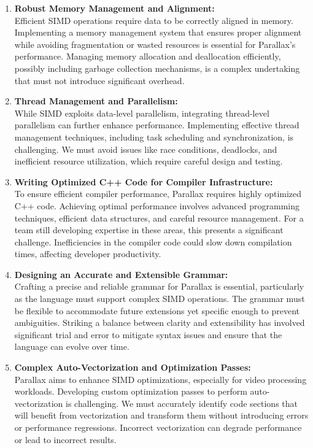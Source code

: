 \documentclass[12pt,a4paper]{article}
\begin{document}
\begin{enumerate}
    \item \textbf{Robust Memory Management and Alignment:} \\
    Efficient SIMD operations require data to be correctly aligned in memory. Implementing a memory management system that ensures proper alignment while avoiding fragmentation or wasted resources is essential for Parallax's performance. Managing memory allocation and deallocation efficiently, possibly including garbage collection mechanisms, is a complex undertaking that must not introduce significant overhead.

    \item \textbf{Thread Management and Parallelism:} \\
    While SIMD exploits data-level parallelism, integrating thread-level parallelism can further enhance performance. Implementing effective thread management techniques, including task scheduling and synchronization, is challenging. We must avoid issues like race conditions, deadlocks, and inefficient resource utilization, which require careful design and testing.

    \item \textbf{Writing Optimized C++ Code for Compiler Infrastructure:} \\
    To ensure efficient compiler performance, Parallax requires highly optimized C++ code. Achieving optimal performance involves advanced programming techniques, efficient data structures, and careful resource management. For a team still developing expertise in these areas, this presents a significant challenge. Inefficiencies in the compiler code could slow down compilation times, affecting developer productivity.

    \item \textbf{Designing an Accurate and Extensible Grammar:} \\
    Crafting a precise and reliable grammar for Parallax is essential, particularly as the language must support complex SIMD operations. The grammar must be flexible to accommodate future extensions yet specific enough to prevent ambiguities. Striking a balance between clarity and extensibility has involved significant trial and error to mitigate syntax issues and ensure that the language can evolve over time.

    \item \textbf{Complex Auto-Vectorization and Optimization Passes:} \\
    Parallax aims to enhance SIMD optimizations, especially for video processing workloads. Developing custom optimization passes to perform auto-vectorization is challenging. We must accurately identify code sections that will benefit from vectorization and transform them without introducing errors or performance regressions. Incorrect vectorization can degrade performance or lead to incorrect results.


\end{enumerate}
\end{document}
